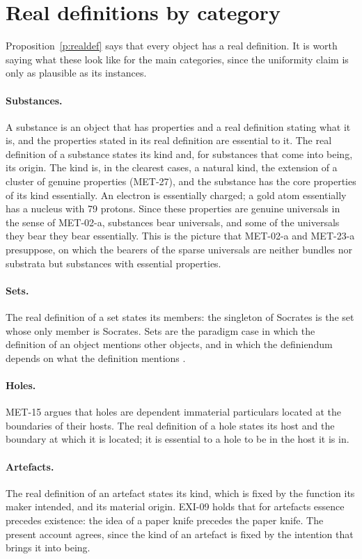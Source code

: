 \documentclass{situationist-preprint}
\begin{document}
\section{Real definitions by category}\label{s:categories}

Proposition~\ref{p:realdef} says that every object has a real definition. It is worth saying what these look like for the main categories, since the uniformity claim is only as plausible as its instances.

\paragraph{Substances.} A substance is an object that has properties and a real definition stating what it is, and the properties stated in its real definition are essential to it. The real definition of a substance states its kind and, for substances that come into being, its origin. The kind is, in the clearest cases, a natural kind, the extension of a cluster of genuine properties (MET-27), and the substance has the core properties of its kind essentially. An electron is essentially charged; a gold atom essentially has a nucleus with 79 protons. Since these properties are genuine universals in the sense of MET-02-a, substances bear universals, and some of the universals they bear they bear essentially. This is the picture that MET-02-a and MET-23-a presuppose, on which the bearers of the sparse universals are neither bundles nor substrata but substances with essential properties.

\paragraph{Sets.} The real definition of a set states its members: the singleton of Socrates is the set whose only member is Socrates. Sets are the paradigm case in which the definition of an object mentions other objects, and in which the definiendum depends on what the definition mentions \citep{Fine1995Dep}.

\paragraph{Holes.} MET-15 argues that holes are dependent immaterial particulars located at the boundaries of their hosts. The real definition of a hole states its host and the boundary at which it is located; it is essential to a hole to be in the host it is in.

\paragraph{Artefacts.} The real definition of an artefact states its kind, which is fixed by the function its maker intended, and its material origin. EXI-09 holds that for artefacts essence precedes existence: the idea of a paper knife precedes the paper knife. The present account agrees, since the kind of an artefact is fixed by the intention that brings it into being.
\end{document}
